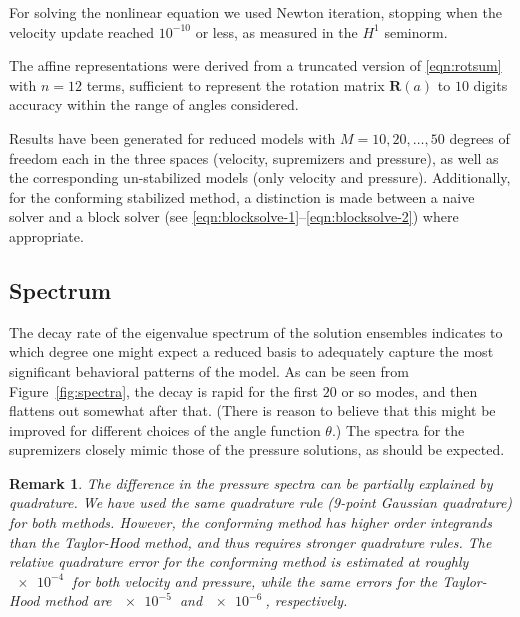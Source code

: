 \documentclass[onecolumn, twoside, a4paper, 11pt]{article}
\newtheorem{remark}{Remark}
\begin{document}
For solving the nonlinear equation we used Newton iteration, stopping when the
velocity update reached $10^{-10}$ or less, as measured in the $H^1$ seminorm.

The affine representations were derived from a truncated version of
\eqref{eqn:rotsum} with $n=12$ terms, sufficient to represent the rotation
matrix $\bm R(a)$ to $10$ digits accuracy within the range of angles considered.

Results have been generated for reduced models with $M=10,20,\ldots,50$ degrees
of freedom each in the three spaces (velocity, supremizers and pressure), as
well as the corresponding un-stabilized models (only velocity and pressure).
Additionally, for the conforming stabilized method, a distinction is made
between a naive solver and a block solver (see
\eqref{eqn:blocksolve-1}--\eqref{eqn:blocksolve-2}) where appropriate.

\subsection{Spectrum}

The decay rate of the eigenvalue spectrum of the solution ensembles indicates to which degree one
might expect a reduced basis to adequately capture the most significant behavioral patterns of the
model. As can be seen from Figure~\ref{fig:spectra}, the decay is rapid for the first $20$ or so
modes, and then flattens out somewhat after that. (There is reason to believe that this might be
improved for different choices of the angle function $\theta$.) The spectra for the supremizers
closely mimic those of the pressure solutions, as should be expected.

\begin{remark}
  The difference in the pressure spectra can be partially explained by quadrature. We have used the
  same quadrature rule (9-point Gaussian quadrature) for both methods. However, the conforming
  method has higher order integrands than the Taylor-Hood method, and thus requires stronger
  quadrature rules. The relative quadrature error for the conforming method is estimated at roughly
  $\SI{e-4}{}$ for both velocity and pressure, while the same errors for the Taylor-Hood method are
  $\SI{e-5}{}$ and $\SI{e-6}{}$, respectively.
\end{remark}
\end{document}

